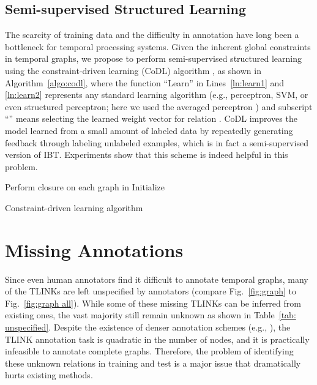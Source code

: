 \documentclass[11pt,letterpaper]{article}
\newcommand{\final}[1]{#1}
\begin{document}
\subsection{Semi-supervised Structured Learning}
The scarcity of training data and the difficulty in \final{annotation} have long been \final{a bottleneck} for temporal processing \final{systems}.
Given the inherent global constraints in temporal graphs, we propose to perform semi-supervised structured learning using the constraint-driven learning (CoDL) algorithm \citep{ChangRaRo07,ChangRaRo12}, as shown in Algorithm~\ref{algo:codl}, where the function ``Learn'' \final{in} Lines~\ref{ln:learn1} and \ref{ln:learn2} represents any standard learning algorithm (e.g., perceptron, SVM, or even structured perceptron; here we used the averaged perceptron \cite{FreundSc98}) and subscript ``'' means selecting the learned weight vector for relation .
CoDL improves the model learned from a small amount of labeled data by repeatedly generating feedback through labeling unlabeled examples, which is in fact a semi-supervised version of IBT.
Experiments show that this scheme is indeed helpful in this problem.

\begin{algorithm}
	\DontPrintSemicolon {}
    Perform closure on each graph in \;
	Initialize \label{ln:learn1}\;
	\Return{}\;
	\caption{Constraint-driven learning algorithm}
	\label{algo:codl}
\end{algorithm}



\section{Missing Annotations}
\label{vaguelinks}
Since even human annotators find it difficult to annotate temporal graphs, many of the TLINKs are left unspecified by annotators (compare Fig.~\ref{fig:graph} to Fig.~\ref{fig:graph all}).
While some of these missing TLINKs can be inferred from existing ones, the vast majority still \final{remain} unknown as shown in Table~\ref{tab: unspecified}.
Despite the existence of denser annotation schemes (e.g., \citet{cassidy2014annotation}), the TLINK annotation task is quadratic in the number of nodes, and it is practically infeasible to annotate complete graphs. 
Therefore, the problem of identifying these unknown relations in training and test is a major issue that dramatically hurts existing methods.
\end{document}

